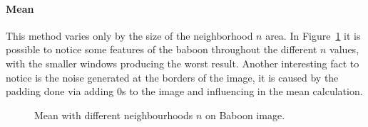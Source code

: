 \documentclass[conference]{IEEEtran}
\begin{document}
\paragraph*{Mean} This method varies only by the size of the neighborhood $n$ area. In Figure~\ref{fig:mean_baboon} it is possible to notice some features of the baboon throughout the different $n$ values, with the smaller windows producing the worst result. Another interesting fact to notice is the noise generated at the borders of the image, it is caused by the padding done via adding $0$s to the image and influencing in the mean calculation.
\begin{figure}[htbp]
	\centering
	\quad
	\caption{Mean with different neighbourhoods $n$ on Baboon image.}
	\label{fig:mean_baboon}
\end{figure}
\end{document}
